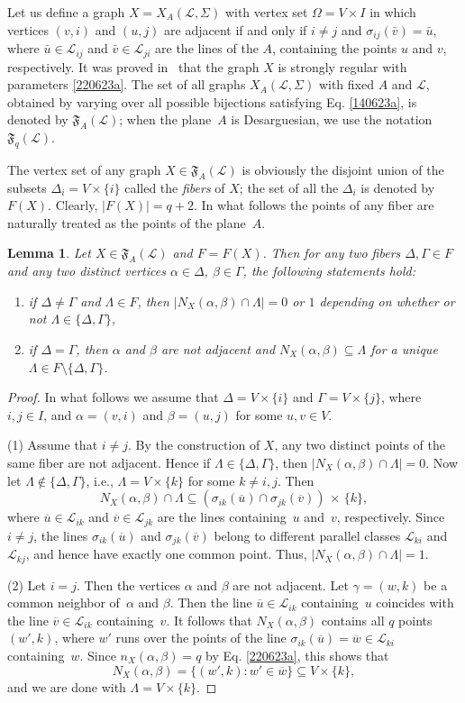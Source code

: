 \documentclass{amsart}
\newcommand{\cal}{\mathcal}
\newtheorem{lemma}[formula]{Lemma}
\def\nmrt{\begin{enumerate}}
\def\enmrt{\end{enumerate}}
\def\tm#1{\item[{\rm (#1)}]}
\def\lmml#1{\begin{lemma}\label{#1}}
\def\elmm{\end{lemma}}
\def\prf{\begin{proof}}
\def\eprf{\end{proof}}
\def\cL{{\cal L}}
\def\fF{{\mathfrak F}}
\def\ov{\overline}
\begin{document}
Let us define a graph $X=X_A(\cL,\Sigma)$ with vertex set $\Omega=V\times I$ in which vertices $(v,i)$ and $(u,j)$ are adjacent if and only if $i\ne j$  and $\sigma_{ij}(\bar v)=\bar u$, where $\bar u\in\cL_{ij}$ and $\bar v\in\cL_{ji}$ are the lines of the $A$, containing the points $u$ and $v$, respectively. It was proved in~ \cite{FonDF2002} that the graph $X$ is  strongly regular with parameters \eqref{220623a}. The set of all graphs $X_A(\cL,\Sigma)$ with fixed $A$ and $\cL$, obtained by varying over all possible 
bijections satisfying Eq. \eqref{140623a}, is denoted by $\fF_A(\cL)$; 
when the plane~$A$ is Desarguesian, we use the notation $\fF_q(\cL)$.

The vertex set of any graph $X\in \fF_A(\cL)$ is obviously the disjoint union of the subsets $\Delta_i=V\times\{i\}$ called the \emph{fibers} of $X$; the set of all the $\Delta_i$ is denoted by~$F(X)$. Clearly, $|F(X)|=q+2$. In what follows the points of any fiber are naturally treated as the points  of the plane~$A$.

\lmml{060623a1}
Let $X\in \fF_A(\cL)$ and $F=F(X)$. Then for any two fibers $\Delta,\Gamma\in F$ and any two distinct vertices $\alpha\in\Delta$, $\beta\in\Gamma$, the following statements hold:
\nmrt
\tm{1} if $\Delta\ne\Gamma$ and $\Lambda\in F$, then $|N_X(\alpha,\beta)\cap \Lambda|=0$  or $1$ depending on whether or not $\Lambda\in\{\Delta,\Gamma\}$,
\tm{2} if $\Delta=\Gamma$, then $\alpha$ and $\beta$ are not adjacent and $N_X(\alpha,\beta)\subseteq \Lambda$ for a unique  $\Lambda\in F\setminus\{\Delta,\Gamma\}$.
\enmrt
\elmm
\prf
In what follows we assume that $\Delta=V\times\{i\}$ and  $\Gamma=V\times\{j\}$, where $i,j\in I$, and $\alpha=(v,i)$ and $\beta=(u,j)$ for some $u,v\in V$.

(1) Assume that $i\ne j$. By the construction of $X$, any two distinct points of the same fiber are not adjacent. Hence if $\Lambda\in\{\Delta,\Gamma\}$, then $|N_X(\alpha,\beta)\cap \Lambda|=0$. Now let $\Lambda\notin\{\Delta,\Gamma\}$, i.e., $\Lambda=V\times\{k\}$ for some $k\ne i,j$.  Then 
$$
N_X(\alpha,\beta)\cap \Lambda\subseteq 
\left(\sigma_{ik}(\ov u)\cap \sigma_{jk}(\ov v)\right)\, \times\,\{k\},
$$
where  $\ov u\in \cL_{ik}$ and $\ov v\in \cL_{jk}$  are the lines containing~$u$ and~$v$, respectively. Since $i\ne j$, the lines  $\sigma_{ik}(\ov u)$ and $\sigma_{jk}(\ov v)$ belong to different parallel classes $\cL_{ki}$ and $\cL_{kj}$, and hence have 
exactly one common point. Thus,
$|N_X(\alpha,\beta)\cap \Lambda|=1$.

(2) Let $i=j$. Then the vertices  $\alpha$ and $\beta$ are not adjacent. Let $\gamma=(w,k)$ be a common neighbor of~$\alpha$ and $\beta$. Then the line $\ov u\in\cL_{ik}$ containing~$u$ coincides with the line $\ov v\in \cL_{ik}$ containing~$v$. It follows that $N_X(\alpha,\beta)$ contains all $q$ points $(w',k)$, where $w'$ runs over the points of 
the line $\sigma_{ik}(\ov u)=\ov w\in\cL_{ki}$ containing~$w$. 
Since $n_X(\alpha,\beta)=q$ by Eq. \eqref{220623a}, 
this shows that 
$$
N_X(\alpha,\beta)=\{(w',k)\colon w'\in\ov w\}\subseteq V\times\{k\},
$$
and we are done with $\Lambda=V\times\{k\}$.
\eprf
\end{document}
